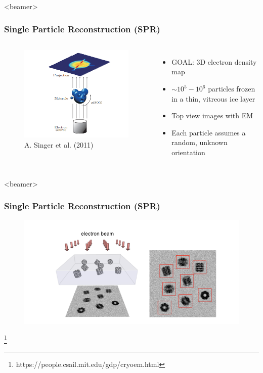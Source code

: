 \documentclass{beamer}
\newcommand\blfootnote[1]{%
  \begingroup
  \renewcommand\thefootnote{}\footnote{#1}%
  \addtocounter{footnote}{-1}%
  \endgroup
}
\begin{document}
\begin{frame}<beamer>
\frametitle{Single Particle Reconstruction (SPR)}
\begin{columns}
\centering
\begin{figure}
\includegraphics[scale=0.6]{figures/cryoem_imaging.png}
\caption{A. Singer et al. (2011)}
\end{figure}

\begin{itemize}
\item GOAL: 3D electron density map 
\item $\sim 10^5-10^6$ particles frozen in a thin, vitreous ice layer
\item Top view images with EM
\item Each particle assumes a random, unknown orientation
\end{itemize}
\end{columns}
\end{frame}

\begin{frame}<beamer>
\frametitle{Single Particle Reconstruction (SPR)}
\begin{figure}[h]
\centering
{\includegraphics[scale=0.65]{figures/imaging_model.png}}
\label{fig:rawims}
\end{figure} 
\blfootnote{https://people.csail.mit.edu/gdp/cryoem.html}
\end{frame}
\end{document}
